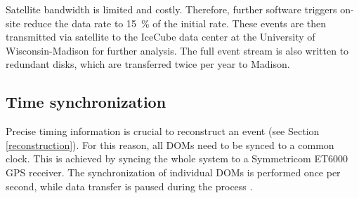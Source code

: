 \documentclass[
    a4paper, %
    fontsize=10pt, %
    twoside=false, %
    numbers=noenddot, %
    fontmethod=tex,
]{kaobook}
\begin{document}
Satellite bandwidth is limited and costly. Therefore, further software triggers on-site reduce the data rate to \SI{15}{\percent} of the initial rate. These events are then transmitted via satellite to the IceCube data center at the University of Wisconsin-Madison for further analysis. The full event stream is also written to redundant disks, which are transferred twice per year to Madison.

\subsection{Time synchronization}
Precise timing information is crucial to reconstruct an event (see Section \ref{reconstruction}). For this reason, all DOMs need to be synced to a common clock. This is achieved by syncing the whole system to a Symmetricom ET6000 GPS receiver. The synchronization of individual DOMs is performed once per second, while data transfer is paused during the process .
\end{document}
